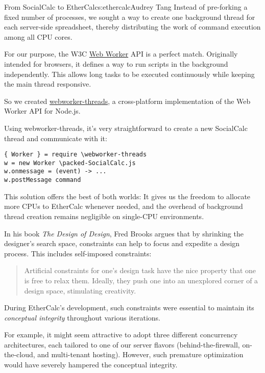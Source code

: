\begin{aosachapter}{From SocialCalc to EtherCalc}{s:ethercalc}{Audrey Tang}
Instead of pre-forking a fixed number of processes, we sought a way to
create one background thread for each server-side spreadsheet, thereby
distributing the work of command execution among all CPU cores.


For our purpose, the W3C \href{http://www.w3.org/TR/workers/}{Web
Worker} API is a perfect match. Originally intended for browsers, it
defines a way to run scripts in the background independently. This
allows long tasks to be executed continuously while keeping the main
thread responsive.

So we created
\href{https://github.com/audreyt/node-webworker-threads}{webworker-threads},
a cross-platform implementation of the Web Worker API for Node.js.

Using webworker-threads, it's very straightforward to create a new
SocialCalc thread and communicate with it:

\begin{verbatim}
{ Worker } = require \webworker-threads
w = new Worker \packed-SocialCalc.js
w.onmessage = (event) -> ...
w.postMessage command
\end{verbatim}

This solution offers the best of both worlds: It gives us the freedom to
allocate more CPUs to EtherCalc whenever needed, and the overhead of
background thread creation remains negligible on single-CPU
environments.



In his book \emph{The Design of Design}, Fred Brooks argues that by
shrinking the designer's search space, constraints can help to focus and
expedite a design process. This includes self-imposed constraints:

\begin{quote}
Artificial constraints for one's design task have the nice property that
one is free to relax them. Ideally, they push one into an unexplored
corner of a design space, stimulating creativity.
\end{quote}

During EtherCalc's development, such constraints were essential to
maintain its \emph{conceptual integrity} throughout various iterations.

For example, it might seem attractive to adopt three different
concurrency architectures, each tailored to one of our server flavors
(behind-the-firewall, on-the-cloud, and multi-tenant hosting). However,
such premature optimization would have severely hampered the conceptual
integrity.


\end{aosachapter}
